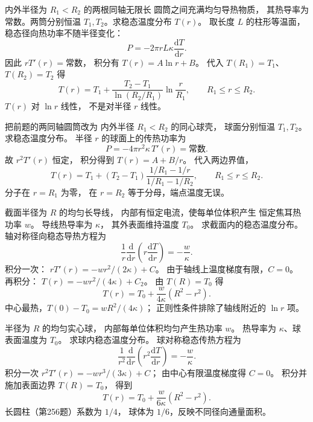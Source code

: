 内外半径为 $R_1<R_2$ 的两根同轴无限长
圆筒之间充满均匀导热物质，
其热导率为常数。两筒分别恒温
$T_1,T_2$。求稳态温度分布 $T(r)$。
\exsolution
取长度 $L$ 的柱形等温面，
稳态径向热功率不随半径变化：
\[
P=-2\pi rL\kappa\frac{\mathrm dT}{\mathrm dr}.
\]
因此 $rT'(r)=\text{常数}$，
积分有 $T(r)=A\ln r+B$。
代入 $T(R_1)=T_1$、
$T(R_2)=T_2$ 得
\[
\boxed{T(r)=T_1+
\frac{T_2-T_1}{\ln(R_2/R_1)}
\ln\frac r{R_1}},\qquad R_1\le r\le R_2.
\]
\excheck $T(r)$ 对 $\ln r$ 线性，
不是对半径 $r$ 线性。

把前题的两同轴圆筒改为
内外半径 $R_1<R_2$ 的同心球壳，
球面分别恒温 $T_1,T_2$。
求稳态温度分布。
\exsolution
半径 $r$ 的球面上的传热功率为
\[
P=-4\pi r^2\kappa\,T'(r)=\text{常数}.
\]
故 $r^2T'(r)$ 恒定，
积分得到 $T(r)=A+B/r$。
代入两边界值，
\[
\boxed{T(r)=T_1+
(T_2-T_1)
\frac{1/R_1-1/r}{1/R_1-1/R_2}},
\qquad R_1\le r\le R_2.
\]
\excheck 分子在 $r=R_1$ 为零，
在 $r=R_2$ 等于分母，端点温度无误。

截面半径为 $R$ 的均匀长导线，
内部有恒定电流，使每单位体积产生
恒定焦耳热功率 $w$。
导线热导率为 $\kappa$，
其外表面维持温度 $T_0$。
求截面内的稳态温度分布。
\exsolution
轴对称径向稳态导热方程为
\[
\frac1r\frac{\mathrm d}{\mathrm dr}
\left(r\frac{\mathrm dT}{\mathrm dr}\right)
=-\frac w\kappa.
\]
积分一次：
$rT'(r)=-wr^2/(2\kappa)+C$。
由于轴线上温度梯度有限，$C=0$。
再积分：
$T(r)=-wr^2/(4\kappa)+C_2$。
由 $T(R)=T_0$ 得
\[
\boxed{T(r)=T_0+\frac w{4\kappa}(R^2-r^2)}.
\]
\excheck 中心最热，$T(0)-T_0=wR^2/(4\kappa)$；
正则性条件排除了轴线附近的 $\ln r$ 项。

半径为 $R$ 的均匀实心球，
内部每单位体积均匀产生热功率 $w$。
热导率为 $\kappa$、球表面温度为 $T_0$。
求球内稳态温度分布。
\exsolution
球对称稳态传热方程为
\[
\frac1{r^2}\frac{\mathrm d}{\mathrm dr}
\left(r^2\frac{\mathrm dT}{\mathrm dr}\right)
=-\frac w\kappa.
\]
积分一次
$r^2T'(r)=-wr^3/(3\kappa)+C$；
由中心有限温度梯度得 $C=0$。
积分并施加表面边界 $T(R)=T_0$，
得到
\[
\boxed{T(r)=T_0+\frac w{6\kappa}(R^2-r^2)}.
\]
\excheck 长圆柱（第256题）系数为 $1/4$，
球体为 $1/6$，反映不同径向通量面积。
